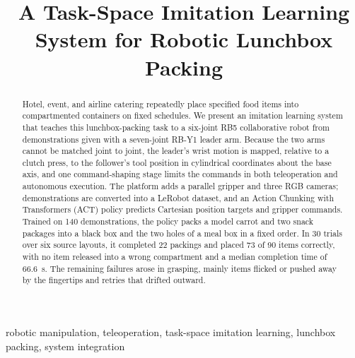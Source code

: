 \documentclass[conference]{IEEEtran}
\title{A Task-Space Imitation Learning System for Robotic Lunchbox Packing}
\author{\IEEEauthorblockN{Author 1}}
\begin{document}
\maketitle

\begin{abstract}
Hotel, event, and airline catering repeatedly place specified food items into
compartmented containers on fixed schedules. We present an imitation learning
system that teaches this lunchbox-packing task to a six-joint RB5
collaborative robot from demonstrations given with a seven-joint RB-Y1 leader
arm. Because the two arms cannot be matched joint to joint, the leader's wrist
motion is mapped, relative to a clutch press, to the follower's tool position
in cylindrical coordinates about the base axis, and one command-shaping stage
limits the commands in both teleoperation and autonomous execution. The
platform adds a parallel gripper and three RGB cameras; demonstrations are
converted into a LeRobot dataset, and an Action Chunking with Transformers
(ACT) policy predicts Cartesian position targets and gripper commands.
Trained on 140 demonstrations, the policy packs a model carrot and two snack
packages into a black box and the two holes of a meal box in a fixed order.
In 30 trials over six source layouts, it completed 22 packings and placed 73
of 90 items correctly, with no item released into a wrong compartment and a
median completion time of 66.6~s. The remaining failures arose in grasping,
mainly items flicked or pushed away by the fingertips and retries that drifted
outward.
\end{abstract}

\begin{IEEEkeywords}
robotic manipulation, teleoperation, task-space imitation learning,
lunchbox packing, system integration
\end{IEEEkeywords}
\end{document}
